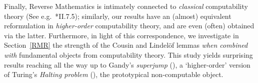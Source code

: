 \documentclass[reqno]{amsart}
\def\R{{\mathbb  R}}
\numberwithin{equation}{section}
\numberwithin{thm}{section}
\begin{document}
\smallskip

Finally, Reverse Mathematics is intimately connected to \emph{classical} computability theory (See e.g.\ \cite{simpson2}*{II.7.5}); similarly, our results have an (almost) equivalent reformulation in \emph{higher-order} computability theory, and are even (often) obtained via the latter.    
Furthermore, in light of this correspondence, we investigate in Section~\ref{RMR} the strength of the Cousin and Lindel\"of lemmas \emph{when combined with} fundamental objects from computability theory.  This study yields surprising results reaching all the way up to Gandy's \emph{superjump} (\cite{supergandy}), a `higher-order' version of Turing's \emph{Halting problem} (\cite{tur37}), the prototypical non-computable object. 

%
\end{document}
